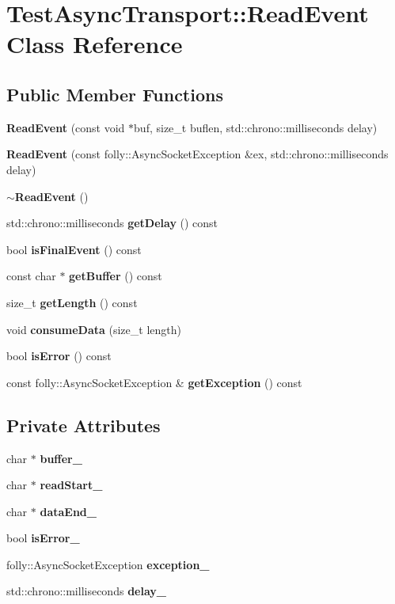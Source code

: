 \section{Test\+Async\+Transport\+:\+:Read\+Event Class Reference}
\label{classTestAsyncTransport_1_1ReadEvent}
\subsection*{Public Member Functions}
\begin{DoxyCompactItemize}
\item 
{\bf Read\+Event} (const void $\ast$buf, size\+\_\+t buflen, std\+::chrono\+::milliseconds delay)
\item 
{\bf Read\+Event} (const folly\+::\+Async\+Socket\+Exception \&ex, std\+::chrono\+::milliseconds delay)
\item 
{\bf $\sim$\+Read\+Event} ()
\item 
std\+::chrono\+::milliseconds {\bf get\+Delay} () const 
\item 
bool {\bf is\+Final\+Event} () const 
\item 
const char $\ast$ {\bf get\+Buffer} () const 
\item 
size\+\_\+t {\bf get\+Length} () const 
\item 
void {\bf consume\+Data} (size\+\_\+t length)
\item 
bool {\bf is\+Error} () const 
\item 
const folly\+::\+Async\+Socket\+Exception \& {\bf get\+Exception} () const 
\end{DoxyCompactItemize}
\subsection*{Private Attributes}
\begin{DoxyCompactItemize}
\item 
char $\ast$ {\bf buffer\+\_\+}
\item 
char $\ast$ {\bf read\+Start\+\_\+}
\item 
char $\ast$ {\bf data\+End\+\_\+}
\item 
bool {\bf is\+Error\+\_\+}
\item 
folly\+::\+Async\+Socket\+Exception {\bf exception\+\_\+}
\item 
std\+::chrono\+::milliseconds {\bf delay\+\_\+}
\end{DoxyCompactItemize}


